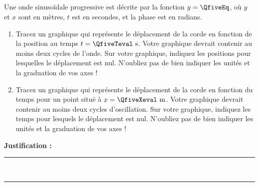 \subsection{}
Une onde sinusoïdale progressive est décrite par la fonction $y = \QfiveEq$, où $y$ et $x$ sont en mètres, $t$ est en secondes, et la phase est en radians.

\begin{enumerate}[label=\Alph*)]
    \item Tracez un graphique qui représente le déplacement de la corde en fonction de la position au temps $t = \QfiveTeval\text{ s}$. Votre graphique devrait contenir au moins deux cycles de l'onde. Sur votre graphique, indiquez les positions pour lesquelles le déplacement est nul. N'oubliez pas de bien indiquer les unités et la graduation de vos axes !
    \item Tracez un graphique qui représente le déplacement de la corde en fonction du temps pour un point situé à $x = \QfiveXeval\text{ m}$. Votre graphique devrait contenir au moins deux cycles d'oscillation. Sur votre graphique, indiquez les temps pour lesquels le déplacement est nul. N'oubliez pas de bien indiquer les unités et la graduation de vos axes !
\end{enumerate}

\noindent\textbf{Justification :} \hrulefill \\[2.5ex]
\rule{\linewidth}{0.4pt} \\[2.5ex]
\rule{\linewidth}{0.4pt}
\vfill